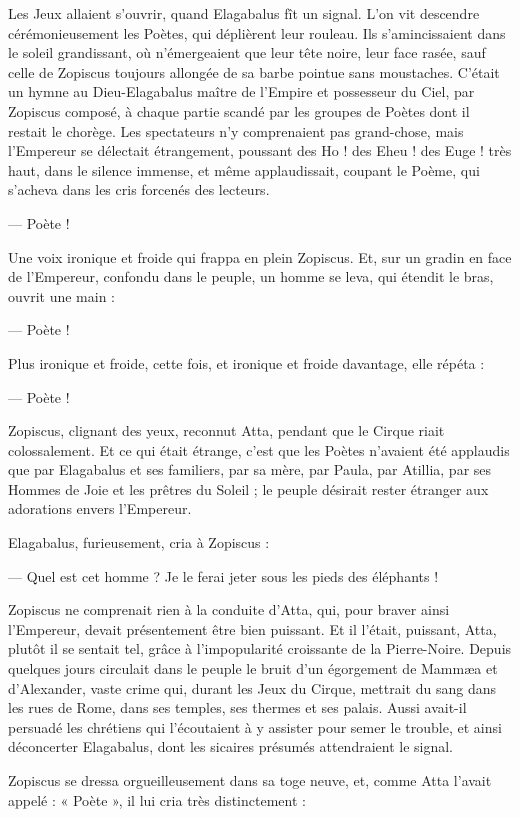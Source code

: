 \documentclass[a4paper, 11pt, oneside, polutonikogreek, french]{article}
\begin{document}
Les Jeux allaient s'ouvrir, quand Elagabalus fît un signal. L'on vit descendre cérémonieusement les Poètes, qui déplièrent leur rouleau. Ils s'amincissaient dans le soleil grandissant, où n'émergeaient que leur tête noire, leur face rasée, sauf celle de Zopiscus toujours allongée de sa barbe pointue sans moustaches. C'était un hymne au Dieu-Elagabalus maître de l'Empire et possesseur du Ciel, par Zopiscus composé, à chaque partie scandé par les groupes de Poètes dont il restait le chorège. Les spectateurs n'y comprenaient pas grand-chose, mais l'Empereur se délectait étrangement, poussant des Ho ! des Eheu ! des Euge ! très haut, dans le silence immense, et même applaudissait, coupant le Poème, qui s'acheva dans les cris forcenés des lecteurs.

--- Poète !

Une voix ironique et froide qui frappa en plein Zopiscus. Et, sur un gradin en face de l'Empereur, confondu dans le peuple, un homme se leva, qui étendit le bras, ouvrit une main :

--- Poète !

Plus ironique et froide, cette fois, et ironique et froide davantage, elle répéta :

--- Poète !

Zopiscus, clignant des yeux, reconnut Atta, pendant que le Cirque riait colossalement. Et ce qui était étrange, c'est que les Poètes n'avaient été applaudis que par Elagabalus et ses familiers, par sa mère, par Paula, par Atillia, par ses Hommes de Joie et les prêtres du Soleil ; le peuple désirait rester étranger aux adorations envers l'Empereur.

Elagabalus, furieusement, cria à Zopiscus :

--- Quel est cet homme ? Je le ferai jeter sous les pieds des éléphants !

Zopiscus ne comprenait rien à la conduite d'Atta, qui, pour braver ainsi l'Empereur, devait présentement être bien puissant. Et il l'était, puissant, Atta, plutôt il se sentait tel, grâce à l'impopularité croissante de la Pierre-Noire. Depuis quelques jours circulait dans le peuple le bruit d'un égorgement de Mammæa et d'Alexander, vaste crime qui, durant les Jeux du Cirque, mettrait du sang dans les rues de Rome, dans ses temples, ses thermes et ses palais. Aussi avait-il persuadé les chrétiens qui l'écoutaient à y assister pour semer le trouble, et ainsi déconcerter Elagabalus, dont les sicaires présumés attendraient le signal.

Zopiscus se dressa orgueilleusement dans sa toge neuve, et, comme Atta l'avait appelé : « Poète », il lui cria très distinctement :
\end{document}
